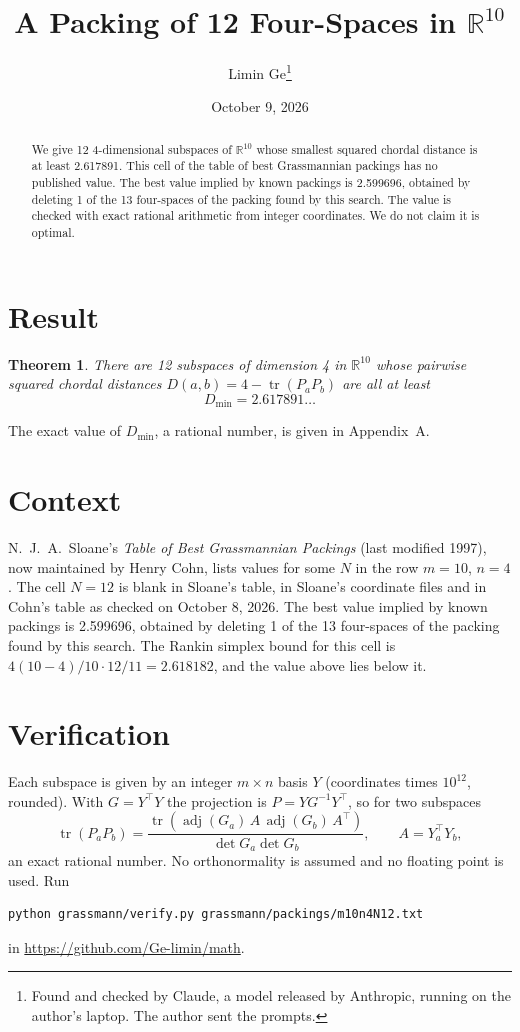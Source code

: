 \documentclass[11pt,a4paper]{article}
\title{A Packing of 12 Four-Spaces in $\mathbb{R}^{10}$}
\author{Limin Ge\thanks{Found and checked by Claude, a model released by Anthropic, running on the author's laptop. The author sent the prompts.}}
\date{October 9, 2026}
\newtheorem*{theorem}{Theorem}
\begin{document}
\maketitle
\begin{abstract}
We give 12 4-dimensional subspaces of $\mathbb{R}^{10}$ whose smallest squared chordal distance is at least 2.617891. This cell of the table of best Grassmannian packings has no published value. The best value implied by known packings is 2.599696, obtained by deleting 1 of the 13 four-spaces of the packing found by this search. The value is checked with exact rational arithmetic from integer coordinates. We do not claim it is optimal.
\end{abstract}

\section{Result}
\begin{theorem}
There are 12 subspaces of dimension 4 in $\mathbb{R}^{10}$ whose pairwise squared chordal distances $D(a,b) = 4 - \operatorname{tr}(P_aP_b)$ are all at least
\[ D_{\min} = 2.617891\ldots \]
\end{theorem}
The exact value of $D_{\min}$, a rational number, is given in Appendix~A.


\section{Context}
N.~J.~A.~Sloane's \emph{Table of Best Grassmannian Packings} (last modified 1997), now maintained by Henry Cohn, lists values for some $N$ in the row $m=10$, $n=4$. The cell $N=12$ is blank in Sloane's table, in Sloane's coordinate files and in Cohn's table as checked on October 8, 2026. The best value implied by known packings is 2.599696, obtained by deleting 1 of the 13 four-spaces of the packing found by this search. The Rankin simplex bound for this cell is $4(10-4)/10\cdot 12/11 = 2.618182$, and the value above lies below it.


\section{Verification}
Each subspace is given by an integer $m\times n$ basis $Y$ (coordinates times $10^{12}$, rounded). With $G=Y^\top Y$ the projection is $P=YG^{-1}Y^\top$, so for two subspaces
\[ \operatorname{tr}(P_aP_b)=\frac{\operatorname{tr}(\operatorname{adj}(G_a)\,A\,\operatorname{adj}(G_b)\,A^\top)}{\det G_a\det G_b},\qquad A=Y_a^\top Y_b, \]
an exact rational number. No orthonormality is assumed and no floating point is used. Run
\begin{verbatim}
python grassmann/verify.py grassmann/packings/m10n4N12.txt
\end{verbatim}
in \url{https://github.com/Ge-limin/math}.
\end{document}
